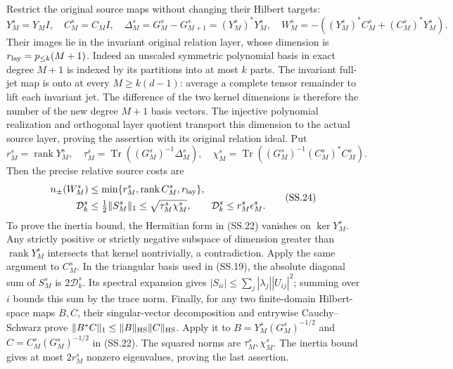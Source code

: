 Restrict the original source maps without changing their Hilbert
targets:
\[
 Y_M^s=Y_MI,\quad C_M^s=C_MI,\quad
 \Delta_M^s=G_M^s-G_{M+1}^s=(Y_M^s)^*Y_M^s,
 \quad W_M^s=-((Y_M^s)^*C_M^s+(C_M^s)^*Y_M^s).          \tag{SS.22}
\]
Their images lie in the invariant original relation layer, whose
dimension is
\(r_{\rm lay}=p_{\le k}(M+1)\).  Indeed an unscaled symmetric
polynomial basis in exact degree \(M+1\) is indexed by its
partitions into at most \(k\) parts.  The invariant full-jet map
is onto at every \(M\ge k(d-1)\): average a complete tensor
remainder to lift each invariant jet.  The difference of the two
kernel dimensions is therefore the number of the new degree
\(M+1\) basis vectors.  The injective polynomial realization and
orthogonal layer quotient transport this dimension to the actual
source layer, proving the assertion with its original relation ideal.
Put
\[
 r_M^s=\operatorname{rank}Y_M^s,\quad
 \tau_M^s=\operatorname{Tr}((G_M^s)^{-1}\Delta_M^s),\quad
 \chi_M^s=\operatorname{Tr}((G_M^s)^{-1}(C_M^s)^*C_M^s).
                                                               \tag{SS.23}
\]
Then the precise relative source costs are
\[
 \begin{split}
 n_\pm(W_M^s)&\le
       \min\{r_M^s,\operatorname{rank}C_M^s,r_{\rm lay}\},\\
 \mathcal D_k^s&\le\tfrac12\|S_M^s\|_1
              \le\sqrt{\tau_M^s\chi_M^s},\qquad
 \mathcal D_k^s\le r_M^s\epsilon_M^s.
 \end{split}                                                  \tag{SS.24}
\]
To prove the inertia bound, the Hermitian form in (SS.22) vanishes
on \(\ker Y_M^s\).  Any strictly positive or strictly negative
subspace of dimension greater than \(\operatorname{rank}Y_M^s\)
intersects that kernel nontrivially, a contradiction.  Apply the same
argument to \(C_M^s\).  In the triangular basis used in (SS.19),
the absolute diagonal sum of \(S_M^s\) is
\(2\mathcal D_k^s\).  Its spectral expansion gives
\(|S_{ii}|\le\sum_j|\lambda_j||U_{ij}|^2\); summing over
\(i\) bounds this sum by the trace norm.  Finally, for any two
finite-domain Hilbert-space maps \(B,C\), their singular-vector
decomposition and entrywise Cauchy--Schwarz prove
\(\|B^*C\|_1\le\|B\|_{\rm HS}\|C\|_{\rm HS}\).
Apply it to \(B=Y_M^s(G_M^s)^{-1/2}\) and
\(C=C_M^s(G_M^s)^{-1/2}\) in (SS.22).  The squared norms
are \(\tau_M^s,\chi_M^s\).  The inertia bound gives at most
\(2r_M^s\) nonzero eigenvalues, proving the last assertion.

